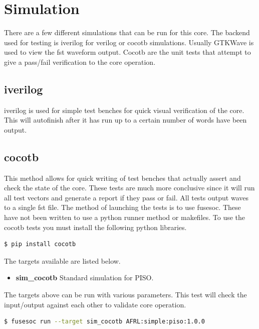 \newpage

\section{Simulation}
\par
There are a few different simulations that can be run for this core. The backend used for testing is iverilog for verilog or cocotb simulations. Usually GTKWave is used to view the fst waveform output. Cocotb are the unit tests that attempt to give a pass/fail verification to the core operation.

\subsection{iverilog}
\par
iverilog is used for simple test benches for quick visual verification of the core. This will autofinish after it has
run up to a certain number of words have been output.

\subsection{cocotb}
\par
This method allows for quick writing of test benches that actually assert and check the state of the core.
These tests are much more conclusive since it will run all test vectors and generate a report if they
pass or fail. All tests output waves to a single fst file. The method of launching the tests is to use
fusesoc. These have not been written to use a python runner method or makefiles.
To use the cocotb tests you must install the following python libraries.
\begin{lstlisting}[language=bash]
  $ pip install cocotb
\end{lstlisting}

The targets available are listed below.
\begin{itemize}
  \item \textbf{sim\_cocotb} Standard simulation for PISO.
\end{itemize}

The targets above can be run with various parameters.
This test will check the input/output against each other to validate core operation.
\begin{lstlisting}[language=bash]
  $ fusesoc run --target sim_cocotb AFRL:simple:piso:1.0.0
\end{lstlisting}

